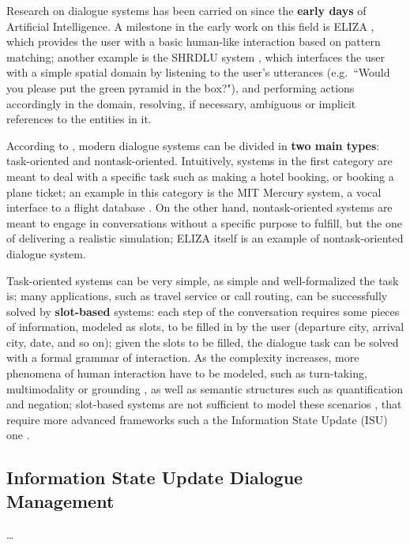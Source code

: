 Research on dialogue systems has been carried on since the \textbf{early days} of Artificial Intelligence. A milestone in the early work on this field is ELIZA \citep{Weizenbaum:1966:ECP:365153.365168}, which provides the user with a basic human-like interaction based on pattern matching; another example is the SHRDLU system \citep{winograd1971procedure}, which interfaces the user with a simple spatial domain by listening to the user's utterances (e.g.\ ``Would you please put the green pyramid in the box?"), and performing actions accordingly in the domain, resolving, if necessary, ambiguous or implicit references to the entities in it.

According to \cite{Jokinen2009}, modern dialogue systems can be divided in \textbf{two main types}: task-oriented and nontask-oriented. Intuitively, systems in the first category are meant to deal with a specific task such as making a hotel booking, or booking a plane ticket; an example in this category is the MIT Mercury system, a vocal interface to a flight database \citep{Seneff:2000:DMM:1605285.1605288}. On the other hand, nontask-oriented systems are meant to engage in conversations without a specific purpose to fulfill, but the one of delivering a realistic simulation; ELIZA itself is an example of nontask-oriented dialogue system.

Task-oriented systems can be very simple, as simple and well-formalized the task is;  many applications, such as travel service or call routing, can be successfully solved by \textbf{slot-based} systems: each step of the conversation requires some pieces of information, modeled as slots, to be filled in by the user (departure city, arrival city, date, and so on); given the slots to be filled, the dialogue task can be solved with a formal grammar of interaction. As the complexity increases, more phenomena of human interaction have to be modeled, such as turn-taking, multimodality or grounding
, as well as semantic structures such as quantification and negation; slot-based systems are not sufficient to model these scenarios \citep{Gabsdil03clarificationin}, that require more advanced frameworks such a the Information State Update (ISU) one \citep{TraumLarsson03p325}.

\subsection{Information State Update Dialogue Management}

\ldots